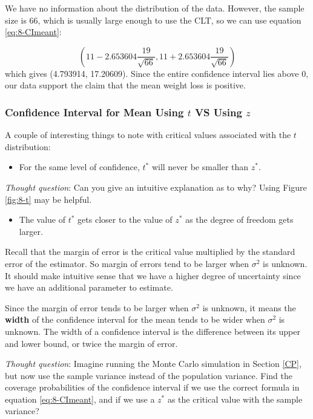 \documentclass[
]{book}
\providecommand{\tightlist}{%
  \setlength{\itemsep}{0pt}\setlength{\parskip}{0pt}}
\begin{document}
We have no information about the distribution of the data. However, the sample size is 66, which is usually large enough to use the CLT, so we can use equation \eqref{eq:8-CImeant}:

\[
\left( 11 - 2.653604 \frac{19}{\sqrt{66}} , 11 + 2.653604 \frac{19}{\sqrt{66}} \right)
\]
which gives (4.793914, 17.20609). Since the entire confidence interval lies above 0, our data support the claim that the mean weight loss is positive.

\subsubsection{\texorpdfstring{Confidence Interval for Mean Using \(t\) VS Using \(z\)}{Confidence Interval for Mean Using t VS Using z}}\label{confidence-interval-for-mean-using-t-vs-using-z}

A couple of interesting things to note with critical values associated with the \(t\) distribution:

\begin{itemize}
\tightlist
\item
  For the same level of confidence, \(t^*\) will never be smaller than \(z^*\).
\end{itemize}

\emph{Thought question}: Can you give an intuitive explanation as to why? Using Figure \ref{fig:8-t} may be helpful.

\begin{itemize}
\tightlist
\item
  The value of \(t^*\) gets closer to the value of \(z^*\) as the degree of freedom gets larger.
\end{itemize}

Recall that the margin of error is the critical value multiplied by the standard error of the estimator. So margin of errors tend to be larger when \(\sigma^2\) is unknown. It should make intuitive sense that we have a higher degree of uncertainty since we have an additional parameter to estimate.

Since the margin of error tends to be larger when \(\sigma^2\) is unknown, it means the \textbf{width} of the confidence interval for the mean tends to be wider when \(\sigma^2\) is unknown. The width of a confidence interval is the difference between its upper and lower bound, or twice the margin of error.

\emph{Thought question}: Imagine running the Monte Carlo simulation in Section \ref{CP}, but now use the sample variance instead of the population variance. Find the coverage probabilities of the confidence interval if we use the correct formula in equation \eqref{eq:8-CImeant}, and if we use a \(z^*\) as the critical value with the sample variance?
\end{document}
